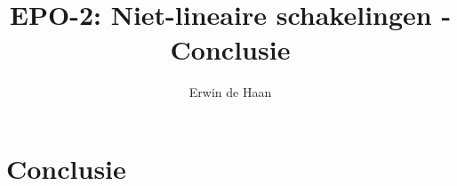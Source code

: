 \documentclass{report}
\title{EPO-2: Niet-lineaire schakelingen - Conclusie}
\author{Erwin de Haan}
\begin{document}
\chapter{Conclusie}
\label{ch:conclusie}
\end{document}
